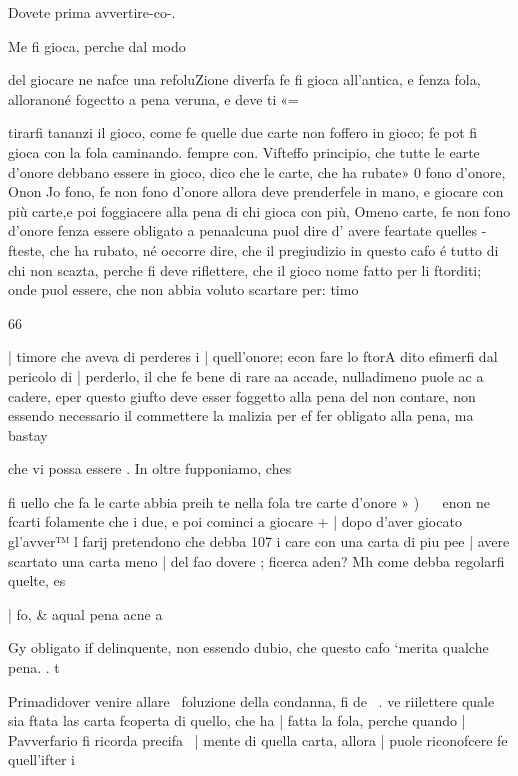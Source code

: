 \documentclass[11pt,a6paper]{article}
\begin{document}
Dovete prima avvertire-co-.

Me fi gioca, perche dal modo

del giocare ne nafce una refoluZione diverfa fe fi gioca all’antica, e fenza fola, alloranoné
fogectto a pena veruna, e deve
ti«=

tirarfi tananzi il gioco, come fe
quelle due carte non foffero in
gioco; fe pot fi gioca con la
fola caminando. fempre con.
Vifteffo principio, che tutte le
earte d’onore debbano essere in
gioco, dico che le carte, che ha
rubate» 0 fono d’onore, Onon
Jo fono, fe non fono d’onore
allora deve prenderfele in mano, e giocare con più carte,e
poi foggiacere alla pena di chi
gioca con più, Omeno carte,
fe non fono d’onore fenza essere obligato a penaalcuna puol
dire d' avere feartate quelles
- fteste, che ha rubato, né occorre dire, che il pregiudizio in
questo cafo é tutto di chi non
scazta, perche fi deve riflettere,
che il gioco nome fatto per li
ftorditi; onde puol essere, che
non abbia voluto scartare per:
timo  

66

| timore che aveva di perderes
i | quell’onore; econ fare lo ftorA dito efimerfi dal pericolo di
| perderlo, il che fe bene di rare
aa accade, nulladimeno puole ac
a cadere, eper questo giufto deve
esser foggetto alla pena del non
contare, non essendo necessario
il commettere la malizia per ef
fer obligato alla pena, ma bastay

che vi possa essere .
In oltre fupponiamo, ches

fi uello che fa le carte abbia preih te nella fola tre carte d’onore »
) ~~ enon ne fcarti folamente che
i due, e poi cominci a giocare +
| dopo d’aver giocato gl’avver™
l farij pretendono che debba 107
i care con una carta di piu pee
| avere scartato una carta meno
| del fao dovere ; ficerca aden?
Mh come debba regolarfi quelte, es

| fo, & aqual pena acne a

 

 

 

 

 

 
  
  

Gy
obligato if delinquente, non
essendo dubio, che questo cafo
‘merita qualche pena. . t

Primadidover venire allare~
foluzione della condanna, fi de~ .
ve riilettere quale sia ftata las
carta fcoperta di quello, che ha |
fatta la fola, perche quando |
Pavverfario fi ricorda precifa~ |
mente di quella carta, allora |
puole riconofcere fe quell’ifter i
\end{document}
